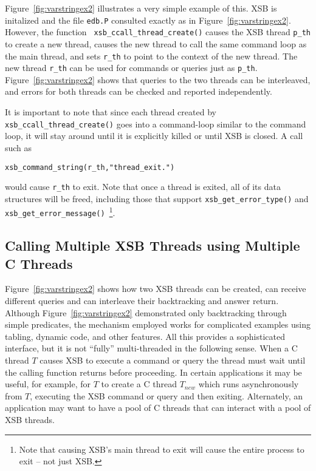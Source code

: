 Figure~\ref{fig:varstringex2} illustrates a very simple example of
this.  XSB is initalized and the file {\tt edb.P} consulted exactly as
in Figure~\ref{fig:varstringex2}.  However, the function {\tt
  xsb\_ccall\_thread\_create()} causes the XSB thread {\tt p\_th} to
create a new thread, causes the new thread to call the same command
loop as the main thread, and sets {\tt r\_th} to point to the context
of the new thread.  The new thread {\tt r\_th} can be used for
commands or queries just as {\tt p\_th}.
Figure~\ref{fig:varstringex2} shows that queries to the two threads
can be interleaved, and errors for both threads can be checked and
reported independently.
 
It is important to note that since each thread created by {\tt
  xsb\_ccall\_thread\_create()} goes into a command-loop similar to
the command loop, it will stay around until it is explicitly killed or
until XSB is closed.  A call such as 
\begin{verbatim}
xsb_command_string(r_th,"thread_exit.")
\end{verbatim}
would cause {\tt r\_th} to exit.  Note that once a thread is exited,
all of its data structures will be freed, including those that support
{\tt xsb\_get\_error\_type()} and {\tt
  xsb\_get\_error\_message()}~\footnote{Note that causing XSB's main
  thread to exit will cause the entire process to exit -- not just XSB.}.

\subsection{Calling Multiple XSB Threads using Multiple C Threads} \label{sec:CXSBMTMT}

Figure~\ref{fig:varstringex2} shows how two XSB threads can be
created, can receive different queries and can interleave their
backtracking and answer return.  Although
Figure~\ref{fig:varstringex2} demonstrated only backtracking through
simple predicates, the mechanism employed works for complicated
examples using tabling, dynamic code, and other features.  All this
provides a sophisticated interface, but it is not ``fully''
multi-threaded in the following sense.  When a C thread $T$ causes XSB
to execute a command or query the thread must wait until the calling
function returns before proceeding.  In certain applications it may be
useful, for example, for $T$ to create a C thread $T_{new}$ which runs
asynchronously from $T$, executing the XSB command or query and then
exiting.  Alternately, an application may want to have a pool of C
threads that can interact with a pool of XSB threads.

